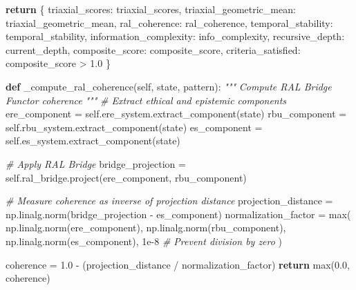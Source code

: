 \documentclass[
]{article}
\newenvironment{Shaded}{}{}
\newcommand{\BuiltInTok}[1]{\textcolor[rgb]{0.00,0.50,0.00}{#1}}
\newcommand{\CommentTok}[1]{\textcolor[rgb]{0.38,0.63,0.69}{\textit{#1}}}
\newcommand{\ControlFlowTok}[1]{\textcolor[rgb]{0.00,0.44,0.13}{\textbf{#1}}}
\newcommand{\FloatTok}[1]{\textcolor[rgb]{0.25,0.63,0.44}{#1}}
\newcommand{\KeywordTok}[1]{\textcolor[rgb]{0.00,0.44,0.13}{\textbf{#1}}}
\newcommand{\NormalTok}[1]{#1}
\newcommand{\OperatorTok}[1]{\textcolor[rgb]{0.40,0.40,0.40}{#1}}
\newcommand{\StringTok}[1]{\textcolor[rgb]{0.25,0.44,0.63}{#1}}
\newcommand{\VariableTok}[1]{\textcolor[rgb]{0.10,0.09,0.49}{#1}}
\begin{document}
\begin{Shaded}
\begin{Highlighting}[]
        \ControlFlowTok{return}\NormalTok{ \{}
            \StringTok{\textquotesingle{}triaxial\_scores\textquotesingle{}}\NormalTok{: triaxial\_scores,}
            \StringTok{\textquotesingle{}triaxial\_geometric\_mean\textquotesingle{}}\NormalTok{: triaxial\_geometric\_mean,}
            \StringTok{\textquotesingle{}ral\_coherence\textquotesingle{}}\NormalTok{: ral\_coherence,}
            \StringTok{\textquotesingle{}temporal\_stability\textquotesingle{}}\NormalTok{: temporal\_stability,}
            \StringTok{\textquotesingle{}information\_complexity\textquotesingle{}}\NormalTok{: info\_complexity,}
            \StringTok{\textquotesingle{}recursive\_depth\textquotesingle{}}\NormalTok{: current\_depth,}
            \StringTok{\textquotesingle{}composite\_score\textquotesingle{}}\NormalTok{: composite\_score,}
            \StringTok{\textquotesingle{}criteria\_satisfied\textquotesingle{}}\NormalTok{: composite\_score }\OperatorTok{\textgreater{}} \FloatTok{1.0}
\NormalTok{        \}}

    \KeywordTok{def}\NormalTok{ \_compute\_ral\_coherence(}\VariableTok{self}\NormalTok{, state, pattern):}
        \CommentTok{"""}
\CommentTok{        Compute RAL Bridge Functor coherence}
\CommentTok{        """}
        \CommentTok{\# Extract ethical and epistemic components}
\NormalTok{        ere\_component }\OperatorTok{=} \VariableTok{self}\NormalTok{.ere\_system.extract\_component(state)}
\NormalTok{        rbu\_component }\OperatorTok{=} \VariableTok{self}\NormalTok{.rbu\_system.extract\_component(state)}
\NormalTok{        es\_component }\OperatorTok{=} \VariableTok{self}\NormalTok{.es\_system.extract\_component(state)}

        \CommentTok{\# Apply RAL Bridge}
\NormalTok{        bridge\_projection }\OperatorTok{=} \VariableTok{self}\NormalTok{.ral\_bridge.project(ere\_component, rbu\_component)}

        \CommentTok{\# Measure coherence as inverse of projection distance}
\NormalTok{        projection\_distance }\OperatorTok{=}\NormalTok{ np.linalg.norm(bridge\_projection }\OperatorTok{{-}}\NormalTok{ es\_component)}
\NormalTok{        normalization\_factor }\OperatorTok{=} \BuiltInTok{max}\NormalTok{(}
\NormalTok{            np.linalg.norm(ere\_component),}
\NormalTok{            np.linalg.norm(rbu\_component),}
\NormalTok{            np.linalg.norm(es\_component),}
            \FloatTok{1e{-}8}  \CommentTok{\# Prevent division by zero}
\NormalTok{        )}

\NormalTok{        coherence }\OperatorTok{=} \FloatTok{1.0} \OperatorTok{{-}}\NormalTok{ (projection\_distance }\OperatorTok{/}\NormalTok{ normalization\_factor)}
        \ControlFlowTok{return} \BuiltInTok{max}\NormalTok{(}\FloatTok{0.0}\NormalTok{, coherence)}


\end{Highlighting}
\end{Shaded}
\end{document}
